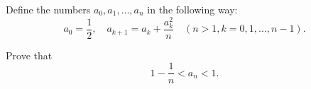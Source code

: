 Define the numbers $a_0, a_1, \ldots, a_n$ in the following way:\[ a_0 = \frac{1}{2}, \quad a_{k+1} = a_k + \frac{a^2_k}{n} \quad (n > 1, k = 0,1, \ldots, n-1).  \]

Prove that \[ 1 - \frac{1}{n} < a_n < 1.\]
